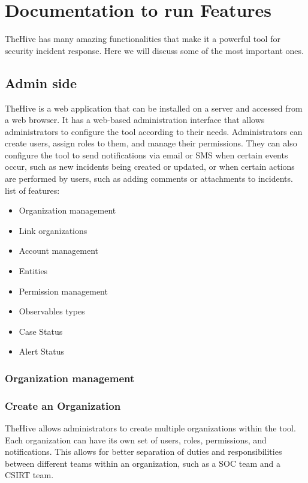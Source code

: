 \documentclass{article}
\begin{document}
\section{Documentation to run Features}
TheHive has many amazing functionalities that make it a powerful tool for security incident response. Here we will discuss some of the most important ones.


\subsection{Admin side}
TheHive is a web application that can be installed on a server and accessed from a web browser. It has a web-based administration interface that allows administrators to configure the tool according to their needs. Administrators can create users, assign roles to them, and manage their permissions. They can also configure the tool to send notifications via email or SMS when certain events occur, such as new incidents being created or updated, or when certain actions are performed by users, such as adding comments or attachments to incidents.
list of features:
\begin{itemize}
\item Organization management
\item Link organizations
\item Account management
\item Entities 
\item Permission management
\item Observables types
\item Case Status
\item Alert Status
\end{itemize}

\subsubsection*{Organization management}
\subsubsection{Create an Organization}

TheHive allows administrators to create multiple organizations within the tool. Each organization can have its own set of users, roles, permissions, and notifications. This allows for better separation of duties and responsibilities between different teams within an organization, such as a SOC team and a CSIRT team.\\
\end{document}
